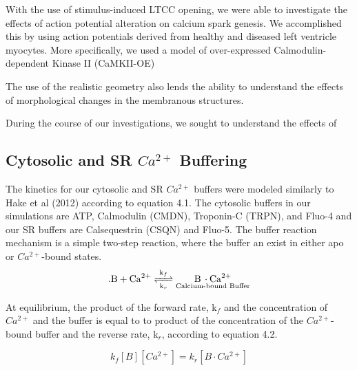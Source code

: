 \documentclass[12pt]{ucsddissertation}
\begin{document}
With the use of stimulus-induced LTCC opening, we were able to investigate the effects of action potential alteration on calcium spark genesis. We accomplished this by using action potentials derived from healthy and diseased left ventricle myocytes. More specifically, we used a model of over-expressed Calmodulin-dependent Kinase II (CaMKII-OE) \cite{Morotti2014}
 

The use of the realistic geometry also lends the ability to understand the effects of morphological changes in the membranous structures. 

During the course of our investigations, we sought to understand the effects of 

\subsection{Cytosolic and SR $Ca^{2+}$ Buffering}


The kinetics for our cytosolic and SR $Ca^{2+}$ buffers were modeled similarly to Hake et al (2012) according to equation 4.1. The cytosolic buffers in our simulations are ATP, Calmodulin (CMDN), Troponin-C (TRPN), and Fluo-4 and our SR buffers are Calsequestrin (CSQN) and Fluo-5.  The buffer reaction mechanism is a simple two-step reaction, where the buffer an exist in either apo or $Ca^{2+}$-bound states. 
\begin{equation}. 
\ce{B + Ca^2+  <=>[\ce{k_{f}}][\ce{k_{r}}]
$\underset{\text{Calcium-bound Buffer}}{\ce{B \cdot Ca^{2+}}}$
}
\end{equation}

At equilibrium, the product of the forward rate, k$_{f}$ and the concentration of $Ca^{2+}$  and the buffer is equal to to product of the concentration of the $Ca^{2+}$-bound buffer and the reverse rate, k$_{r}$, according to equation 4.2.  

\begin{equation}
k_{f}[B][Ca^{2+}] = k_{r}[B \cdot Ca^{2+}]
\end{equation}
\end{document}
